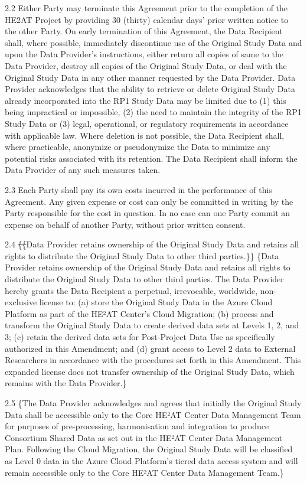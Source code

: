 \documentclass[12pt,letterpaper]{article}
\newcommand{\deleted}[1]{\textcolor{deletecolor}{\sout{#1}}}
\newcommand{\added}[1]{\textcolor{addcolor}{#1}}
\begin{document}
2.2	Either Party may terminate this Agreement prior to the completion of the HE2AT Project by providing 30 (thirty) calendar days’ prior written notice to the other Party. On early termination of this Agreement, the Data Recipient shall, where possible, immediately discontinue use of the Original Study Data and upon the Data Provider’s instructions, either return all copies of same to the Data Provider, destroy all copies of the Original Study Data, or deal with the Original Study Data in any other manner requested by the Data Provider. Data Provider acknowledges that the ability to retrieve or delete Original Study Data already incorporated into the RP1 Study Data may be limited due to (1) this being impractical or impossible, (2) the need to maintain the integrity of the RP1 Study Data or (3) legal, operational, or regulatory requirements in accordance with applicable law. Where deletion is not possible, the Data Recipient shall, where practicable, anonymize or pseudonymize the Data to minimize any potential risks associated with its retention. The Data Recipient shall inform the Data Provider of any such measures taken.

2.3	Each Party shall pay its own costs incurred in the performance of this Agreement. Any given expense or cost can only be committed in writing by the Party responsible for the cost in question. In no case can one Party commit an expense on behalf of another Party, without prior written consent.

2.4	\deleted\{\deleted\{Data Provider retains ownership of the Original Study Data and retains all rights to distribute the Original Study Data to other third parties.\}\} \added\{Data Provider retains ownership of the Original Study Data and retains all rights to distribute the Original Study Data to other third parties. The Data Provider hereby grants the Data Recipient a perpetual, irrevocable, worldwide, non-exclusive license to: (a) store the Original Study Data in the Azure Cloud Platform as part of the HE²AT Center's Cloud Migration; (b) process and transform the Original Study Data to create derived data sets at Levels 1, 2, and 3; (c) retain the derived data sets for Post-Project Data Use as specifically authorized in this Amendment; and (d) grant access to Level 2 data to External Researchers in accordance with the procedures set forth in this Amendment. This expanded license does not transfer ownership of the Original Study Data, which remains with the Data Provider.\}

2.5	\added\{The Data Provider acknowledges and agrees that initially the Original Study Data shall be accessible only to the Core HE²AT Center Data Management Team for purposes of pre-processing, harmonisation and integration to produce Consortium Shared Data as set out in the HE²AT Center Data Management Plan. Following the Cloud Migration, the Original Study Data will be classified as Level 0 data in the Azure Cloud Platform's tiered data access system and will remain accessible only to the Core HE²AT Center Data Management Team.\}
\end{document}
